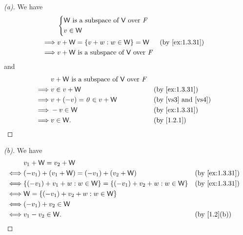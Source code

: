 \begin{proof}[(a)]
  We have
  \begin{align*}
             & \begin{dcases}
      \W \text{ is a subspace of } \V \text{ over } \F \\
      v \in \W
    \end{dcases}                                                            \\
    \implies & v + \W = \set{v + w : w \in \W} = \W                 &  & \text{(by \cref{ex:1.3.31})} \\
    \implies & v + \W \text{ is a subspace of } \V \text{ over } \F
  \end{align*}
  and
  \begin{align*}
             & v + \W \text{ is a subspace of } \V \text{ over } \F                                          \\
    \implies & v \in v + \W                                         &  & \text{(by \cref{ex:1.3.31})}        \\
    \implies & v + (-v) = \zv \in v + \W                            &  & \text{(by \ref{vs3} and \ref{vs4})} \\
    \implies & -v \in \W                                            &  & \text{(by \cref{ex:1.3.31})}        \\
    \implies & v \in \W.                                            &  & \text{(by \cref{1.2.1})}
  \end{align*}
\end{proof}

\begin{proof}[(b)]
  We have
  \begin{align*}
         & v_1 + \W = v_2 + \W                                                                                     \\
    \iff & (-v_1) + (v_1 + \W) = (-v_1) + (v_2 + \W)                             &  & \text{(by \cref{ex:1.3.31})} \\
    \iff & \set{(-v_1) + v_1 + w : w \in \W} = \set{(-v_1) + v_2 + w : w \in \W} &  & \text{(by \cref{ex:1.3.31})} \\
    \iff & \W = \set{(-v_1) + v_2 + w : w \in \W}                                                                  \\
    \iff & (-v_1) + v_2 \in \W                                                                                     \\
    \iff & v_1 - v_2 \in \W.                                                     &  & \text{(by \cref{1.2}(b))}
  \end{align*}
\end{proof}

